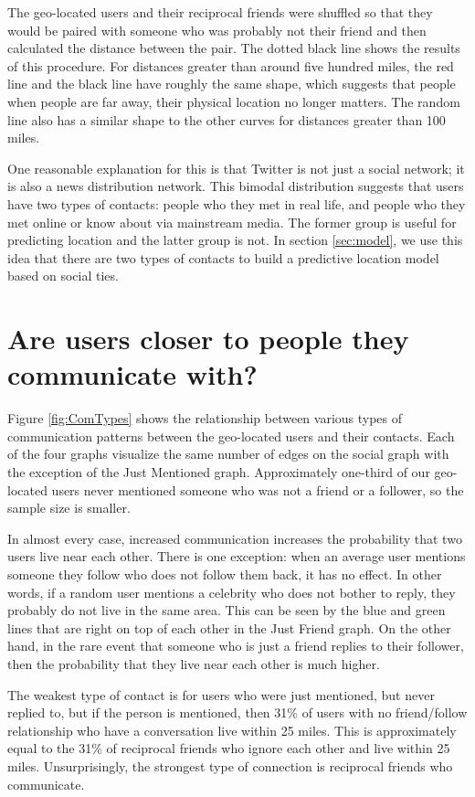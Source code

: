 The geo-located users and their reciprocal friends were shuffled so that they
would be paired with someone who was probably not their friend and then
calculated the distance between the pair.
The dotted black line shows the results of this procedure.
For distances greater than around five
hundred miles, the red line and the black line have roughly the same shape,
which suggests that people when people are far away, their physical location no
longer matters.
The random line also has a similar shape to the other curves for distances
greater than 100 miles.

One reasonable explanation for this is that Twitter is not just a social
network; it is also a news distribution network.  This bimodal distribution
suggests that users have two types of contacts: people who they met in
real life, and people who they met online or know about via mainstream media.
The former group is useful for predicting location and the latter group is not.
In section \ref{sec:model}, we use this idea that there are two types of
contacts to build a predictive location model based on social ties.


\section{Are users closer to people they communicate with?}

Figure \ref{fig:ComTypes} shows the relationship between various types of
communication patterns between the geo-located users and their contacts.
Each of the four graphs visualize the same number of edges on the social graph
with the exception of the Just Mentioned graph. Approximately one-third of our
geo-located users never mentioned someone who was not a friend or a follower,
so the sample size is smaller.

In almost every case, increased communication increases the probability that
two users live near each other.
There is one exception: when an average user mentions someone they follow who
does not follow them back, it has no effect.
In other words, if a random user mentions a celebrity who does not bother to
reply, they probably do not live in the same area. This can be seen by the blue
and green lines that are right on top of each other in the Just Friend graph.
On the other hand, in the rare event that someone who is just a friend replies
to their follower, then the probability that they live near each other is much
higher.

The weakest type of contact is for users who were just mentioned, but never
replied to, but if the person is mentioned, then 31\% of users with no
friend/follow relationship who have a conversation live within 25 miles.
This is approximately equal to the 31\% of reciprocal friends who ignore each
other and live within 25 miles.
Unsurprisingly, the strongest type of connection is reciprocal friends who
communicate.


